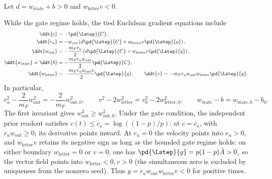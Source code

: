 Let $d=w_{\mathrm{state}}+b>0$ and $w_{\mathrm{letter}} v<0$.

While the gate regime holds, the tied Euclidean gradient equations include
\begin{align}
 \ddt{c}&=-\pd{\Lstep}{C},\label{eq:lr-factor-u}\\
 \ddt{r_u}&=-w_{\mathrm{out}}\left(d\pd{\Lstep}{C}+w_{\mathrm{letter}} v\pd{\Lstep}{g}\right),\\
 \ddt{w_{\mathrm{out}}}&=-\frac{m_F r_u}{2}
 \left(d\pd{\Lstep}{C}+w_{\mathrm{letter}} v\pd{\Lstep}{g}\right),\\
 \ddt{w_{\mathrm{state}}}=\ddt{b}&=-\frac{m_F r_uw_{\mathrm{out}}}{2}\pd{\Lstep}{C},\\
 \ddt{w_{\mathrm{letter}}}&=-\frac{m_F r_uw_{\mathrm{out}} v}{2}\pd{\Lstep}{g},\qquad
 \ddt{v}=-m_F r_uw_{\mathrm{out}}w_{\mathrm{letter}}\pd{\Lstep}{g}.
 \label{eq:lr-factor-bv}
\end{align}
In particular,
\begin{equation}\label{eq:lr-factor-invariants}
 r_u^2-\frac{2}{m_F}w_{\mathrm{out}}^2=-\frac{2}{m_F}w_{\mathrm{out},0}^2,
 \qquad
 v^2-2w_{\mathrm{letter}}^2=v_0^2-2w_{\mathrm{letter},0}^2,
 \qquad w_{\mathrm{state}}-b=w_{\mathrm{state},0}-b_0.
\end{equation}
The first invariant gives $w_{\mathrm{out}}^2\ge w_{\mathrm{out},0}^2$.  Under the gate
condition, the independent prior readout satisfies
$c(t)\le c_\star=\log((1-p)/p)$: at $c=c_\star$, with $r_uw_{\mathrm{out}}\ge0$,
its derivative points inward.  At $r_u=0$ the velocity points into $r_u>0$,
and $w_{\mathrm{letter}} v$ retains its negative sign as long as the bounded gate regime
holds: on either boundary $w_{\mathrm{letter}}=0$ or $v=0$, one has $\pd{\Lstep}{g}=p(1-p)\bar A>0$,
so the vector field points into $w_{\mathrm{letter}}<0,v>0$ (the simultaneous zero is excluded
by uniqueness from the nonzero seed). Thus $g=r_uw_{\mathrm{out}} {w_{\mathrm{letter}} v}<0$ for positive times.

